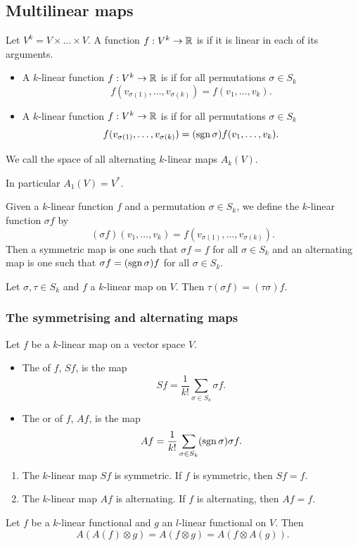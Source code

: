 \subsection{Multilinear maps}
\begin{definition}
Let $V^k = V\times \ldots \times V$. A function $f: V^k\to \mathbb{R}$ is  if it is linear in each of its arguments.
\begin{itemize}
\item A $k$-linear function $f:V^k\to \mathbb{R}$ is  if for all permutations $\sigma\in S_k$
\[ f(v_{\sigma(1)},\ldots, v_{\sigma(k)}) = f(v_1,\ldots, v_k). \]
\item A $k$-linear function $f:V^k\to \mathbb{R}$ is  if for all permutations $\sigma\in S_k$
\[ f(v_{\sigma(1)},\ldots, v_{\sigma(k)}) = (\operatorname{sgn}\sigma)f(v_1,\ldots, v_k). \]
\end{itemize}
We call the space of all alternating $k$-linear maps $A_k(V)$.
\end{definition}
In particular $A_1(V) = V^*$.
\begin{note}
Given a $k$-linear function $f$ and a permutation $\sigma\in S_k$, we define the $k$-linear function $\sigma f$ by
\[ (\sigma f)(v_1,\ldots, v_k) = f(v_{\sigma(1)},\ldots, v_{\sigma(k)}). \]
Then a symmetric map is one such that $\sigma f = f$ for all $\sigma\in S_k$ and an alternating map is one such that $\sigma f = (\operatorname{sgn} \sigma)f$ for all $\sigma\in S_k$.
\end{note} 
\begin{lemma}
Let $\sigma,\tau \in S_k$ and $f$ a $k$-linear map on $V$. Then $\tau(\sigma f) = (\tau \sigma)f$.
\end{lemma}
\subsubsection{The symmetrising and alternating maps}
\begin{definition}
Let $f$ be a $k$-linear map on a vector space $V$.
\begin{itemize}
\item The  of $f$, $Sf$, is the map
\[ Sf = \frac{1}{k!}\sum_{\sigma\in S_k}\sigma f. \]
\item The  or  of $f$, $Af$, is the map
\[ Af = \frac{1}{k!}\sum_{\sigma\in S_k}(\operatorname{sgn} \sigma)\sigma f. \]
\end{itemize}
\end{definition}
\begin{lemma}
\begin{enumerate}
\item The $k$-linear map $Sf$ is symmetric. If $f$ is symmetric, then $Sf = f$.
\item The $k$-linear map $Af$ is alternating. If $f$ is alternating, then $Af = f$.
\end{enumerate}
\end{lemma}
\begin{lemma} \label{idempotenceA}
Let $f$ be a $k$-linear functional and $g$ an $l$-linear functional on $V$. Then
\[ A(A(f)\otimes g) = A(f\otimes g) = A(f\otimes A(g)). \]
\end{lemma}
